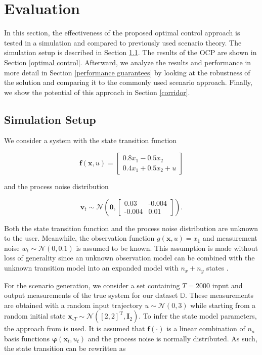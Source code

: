 \chapter{Evaluation} \label{Evaluation}

In this section, the effectiveness of the proposed optimal control approach is tested in a simulation and compared to previously used scenario theory. The simulation setup is described in Section \ref{Setup}. The results of the OCP are shown in Section \ref{optimal control}. Afterward, we analyze the results and performance in more detail in Section \ref{performance guarantees} by looking at the robustness of the solution and comparing it to the commonly used scenario approach. Finally, we show the potential of this approach in Section \ref{corridor}.

\section{Simulation Setup} \label{Setup}

We consider a system with the state transition function

\begin{equation} \label{linear system}
\boldsymbol{f}(\boldsymbol{x}, u) = 
\begin{bmatrix}
0.8  x_1 - 0.5 x_2 \\
0.4 x_1 + 0.5 x_2 + u
\end{bmatrix}
\end{equation}

and the process noise distribution

\begin{equation}
\boldsymbol{v}_t \sim \mathcal{N} \left(\boldsymbol{0}, 
\begin{bmatrix}
0.03 & \text{-}0.004 \\
\text{-}0.004 & 0.01
\end{bmatrix}
\right).
\end{equation}

Both the state transition function and the process noise distribution are unknown to the user. Meanwhile, the observation function $g(\boldsymbol{x}, u) = x_1$ and measurement noise $w_t \sim \mathcal{N} (0, 0.1)$ is assumed to be known. This assumption is made without loss of generality since an unknown observation model can be combined with the unknown transition model into an expanded model with $n_x + n_y$ states \cite{Frigola_15}.


For the scenario generation, we consider a set containing $T = 2000$ input and output measurements of the true system for our dataset $\mathbb{D}$. These measurements are obtained with a random input trajectory $u \sim \mathcal{N} (0, 3)$ while starting from a random initial state $\boldsymbol{x}_{\text{-}T} \sim \mathcal{N} ([2, 2]^\text{T}, \boldsymbol{I}_2)$. To infer the state model parameters, the approach from \cite{Svensson_17} is used. It is assumed that $\boldsymbol{f}(\cdot)$ is a linear combination of $n_a$ basis functions $\boldsymbol{\varphi}(\boldsymbol{x}_t, u_t)$ and the process noise is normally distributed. As such, the state transition can be rewritten as

